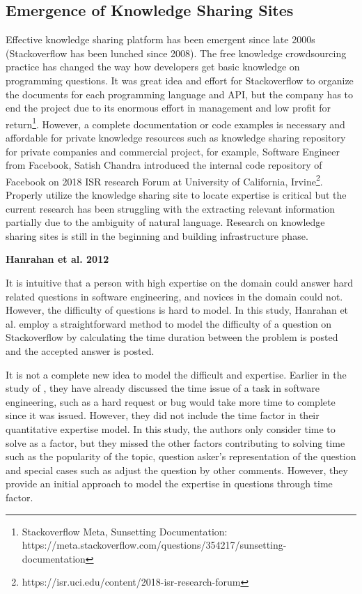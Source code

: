 \subsection{Emergence of Knowledge Sharing Sites}

Effective knowledge sharing platform has been emergent since late 2000s (Stackoverflow has been lunched since 2008). The free knowledge crowdsourcing practice has changed the way how developers get basic knowledge on programming questions. It was great idea and effort for Stackoverflow to organize the documents for each programming language and API, but the company has to end the project due to its enormous effort in management and low profit for return\footnote{Stackoverflow Meta, Sunsetting Documentation: https://meta.stackoverflow.com/questions/354217/sunsetting-documentation}. However, a complete documentation or code examples is necessary and affordable for private knowledge resources such as knowledge sharing repository for private companies and commercial project, for example, Software Engineer from Facebook, Satish Chandra introduced the internal code repository of Facebook on 2018 ISR research Forum at University of California, Irvine\footnote{https://isr.uci.edu/content/2018-isr-research-forum}. Properly utilize the knowledge sharing site to locate expertise is critical but the current research has been struggling with the extracting relevant information partially due to the ambiguity of natural language. Research on knowledge sharing sites is still in the beginning and building infrastructure phase.

\textbf{Hanrahan et al. 2012}

It is intuitive that a person with high expertise on the domain could answer hard related questions in software engineering, and novices in the domain could not. However, the difficulty of questions is hard to model. In this study, Hanrahan et al. employ a straightforward method to model the difficulty of a question on Stackoverflow by calculating the time duration between the problem is posted and the accepted answer is posted.

It is not a complete new idea to model the difficult and expertise. Earlier in the study of \cite{mockus2002expertise}, they have already discussed the time issue of a task in software engineering, such as a hard request or bug would take more time to complete since it was issued. However, they did not include the time factor in their quantitative expertise model. In this study, the authors only consider time to solve as a factor, but they missed the other factors contributing to solving time such as the popularity of the topic, question asker's representation of the question and special cases such as adjust the question by other comments. However, they provide an initial approach to model the expertise in questions through time factor.

